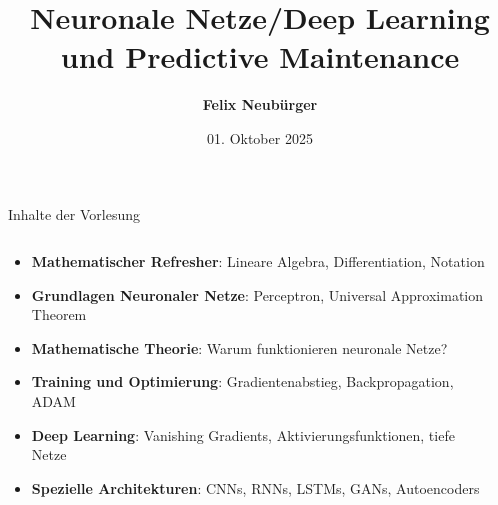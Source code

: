 \documentclass[aspectratio=1610, xcolor=dvipsnames, 9pt]{beamer}
\title{Neuronale Netze/Deep Learning und Predictive Maintenance}
\author[F.~Neubürger,]{ \textbf{Felix Neubürger}}
\institute[I \& W]{Fachhochschule Südwestfalen, Ingenieurs- \& Wirtschaftswissenschaften}
\date{01. Oktober 2025}
\begin{document}
\maketitle

\begin{frame}{Inhalte der Vorlesung}
  \begin{columns}
    \begin{column}{1\textwidth}
      \begin{itemize}
        \item \textbf{Mathematischer Refresher}: Lineare Algebra, Differentiation, Notation \newline
        \item \textbf{Grundlagen Neuronaler Netze}: Perceptron, Universal Approximation Theorem \newline
        \item \textbf{Mathematische Theorie}: Warum funktionieren neuronale Netze? \newline
        \item \textbf{Training und Optimierung}: Gradientenabstieg, Backpropagation, ADAM \newline
        \item \textbf{Deep Learning}: Vanishing Gradients, Aktivierungsfunktionen, tiefe Netze \newline
        \item \textbf{Spezielle Architekturen}: CNNs, RNNs, LSTMs, GANs, Autoencoders \newline

      \end{itemize}
    \end{column}
    \begin{column}{0\textwidth}
    \end{column}
  \end{columns}
\end{frame}
\end{document}
